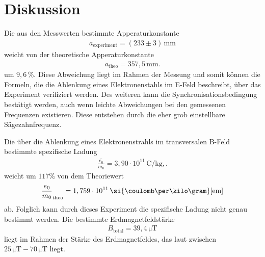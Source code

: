 \newpage
\section{Diskussion}
Die aus den Messwerten bestimmte Apperaturkonstante
\begin{align*}
a_\mathrm{experiment}=(233\pm3)\,\si{\milli\meter}
\end{align*}
weicht von der theoretische Apperaturkonstante
\begin{align*}
  a_\mathrm{theo}=357,5\,\si{\milli\meter}.
\end{align*}
um $9,6\,\si{\percent}$. Diese Abweichung
liegt im Rahmen der Messung
und somit können die Formeln, die die
Ablenkung eines Elektronenstahls im
E-Feld beschreibt, über das Experiment
verifiziert werden.
Des weiteren kann
die Synchronisationsbedingung
bestätigt werden, auch wenn
leichte Abweichungen bei den
gemessenen Frequenzen existieren.
Diese entstehen durch die eher
grob einstellbare Sägezahnfrequenz.

Die über die Ablenkung
eines Elektronenstrahls im transversalen
B-Feld bestimmte spezifische Ladung
\begin{align*}
\overline{\frac{e_0}{m_0}}=3,90\cdot 10^{11}\,\si{\coulomb\per\kilo\gram},.
\end{align*}
weicht um $117\si{\percent} $
von dem Theoriewert
\begin{align*}
\frac{e_0}{m_0}_\mathrm{theo}=1,759\cdot 10^{11}\,\si{\coulomb\per\kilo\gram} \text{\cite{em}}
\end{align*}
ab. Folglich kann durch dieses Experiment
die spezifische Ladung nicht genau bestimmt werden.
Die bestimmte Erdmagnetfeldstärke
\begin{align*}
  B_\mathrm{total}=39,4\,\si{\micro\tesla}
\end{align*}
liegt im Rahmen der Stärke des
Erdmagnetfeldes, das laut \cite{erde}
zwischen $25\,\si{\micro\tesla}-70\,\si{\micro\tesla}$
liegt.
